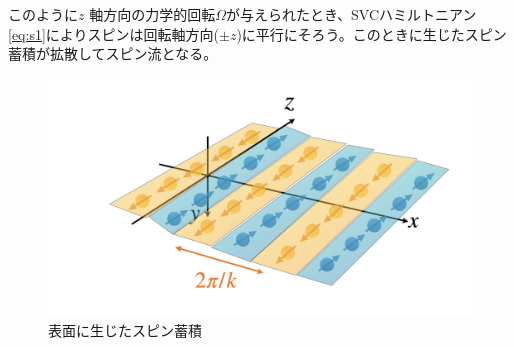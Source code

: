 \documentclass[dvipdfmx,11pt]{jsreport}
\numberwithin{equation}{chapter}
\numberwithin{table}{chapter}
\begin{document}
このように$z$ 軸方向の力学的回転$\Omega$が与えられたとき、SVCハミルトニアン\eqref{eq:s1}によりスピンは回転軸方向($\pm z$)に平行にそろう。このときに生じたスピン蓄積が拡散してスピン流となる。
\begin{figure}[H]
	\centering
	\includegraphics[width=\textwidth]{fig/fig.003.jpeg}
	\caption{表面に生じたスピン蓄積}
	\label{fig:fig-fig-003-jpeg}
\end{figure}
\end{document}
